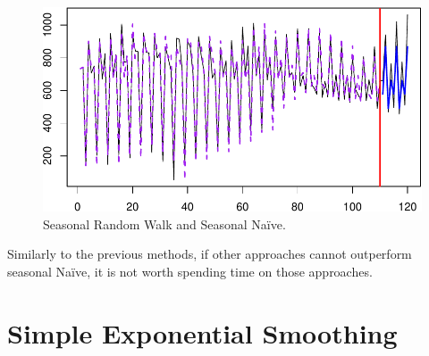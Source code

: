 \documentclass[]{book}
\newenvironment{Shaded}{\begin{snugshade}}{\end{snugshade}}
\newcommand{\DataTypeTok}[1]{\textcolor[rgb]{0.13,0.29,0.53}{#1}}
\newcommand{\DecValTok}[1]{\textcolor[rgb]{0.00,0.00,0.81}{#1}}
\newcommand{\KeywordTok}[1]{\textcolor[rgb]{0.13,0.29,0.53}{\textbf{#1}}}
\newcommand{\NormalTok}[1]{#1}
\newcommand{\OperatorTok}[1]{\textcolor[rgb]{0.81,0.36,0.00}{\textbf{#1}}}
\newcommand{\OtherTok}[1]{\textcolor[rgb]{0.56,0.35,0.01}{#1}}
\newcommand{\StringTok}[1]{\textcolor[rgb]{0.31,0.60,0.02}{#1}}
\theoremstyle{definition}
\theoremstyle{definition}
\theoremstyle{definition}
\theoremstyle{definition}
\theoremstyle{remark}
\begin{document}
\begin{Shaded}
\end{Shaded}

\begin{figure}
\centering
\includegraphics{Svetunkov--2022----ADAM_files/figure-latex/NaiveSeasonalExample-1.pdf}
\caption{\label{fig:NaiveSeasonalExample}Seasonal Random Walk and Seasonal Naïve.}
\end{figure}

Similarly to the previous methods, if other approaches cannot outperform seasonal Naïve, it is not worth spending time on those approaches.

\hypertarget{SES}{%
\section{Simple Exponential Smoothing}\label{SES}}
\end{document}
